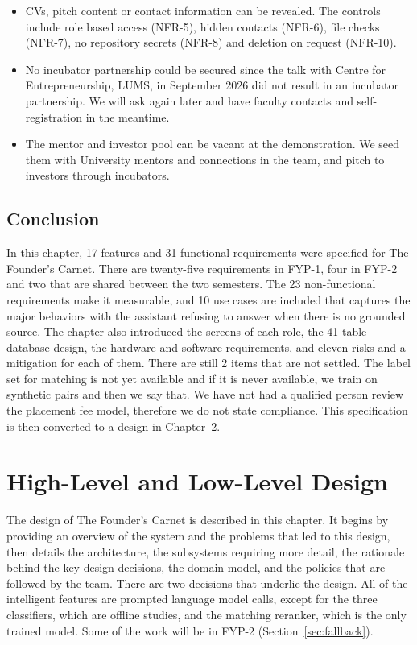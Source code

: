 \documentclass{FastFyp}
\begin{document}
\begin{itemize}
 \item CVs, pitch content or contact information can be revealed. The controls include role based access (NFR-5), hidden contacts (NFR-6), file checks (NFR-7), no repository secrets (NFR-8) and deletion on request (NFR-10).
 \item No incubator partnership could be secured since the talk with Centre for Entrepreneurship, LUMS, in September 2026 did not result in an incubator partnership. We will ask again later and have faculty contacts and self-registration in the meantime.
 \item The mentor and investor pool can be vacant at the demonstration. We seed them with University mentors and connections in the team, and pitch to investors through incubators.
\end{itemize}

\section{Conclusion}
In this chapter, 17 features and 31 functional requirements were specified for The Founder's Carnet. There are twenty-five requirements in FYP-1, four in FYP-2 and two that are shared between the two semesters. The 23 non-functional requirements make it measurable, and 10 use cases are included that captures the major behaviors with the assistant refusing to answer when there is no grounded source. The chapter also introduced the screens of each role, the 41-table database design, the hardware and software requirements, and eleven risks and a mitigation for each of them. There are still 2 items that are not settled. The label set for matching is not yet available and if it is never available, we train on synthetic pairs and then we say that. We have not had a qualified person review the placement fee model, therefore we do not state compliance. This specification is then converted to a design in Chapter~\ref{chap:system-design}.

\chapter{High-Level and Low-Level Design}\label{chap:system-design}
The design of The Founder's Carnet is described in this chapter. It begins by providing an overview of the system and the problems that led to this design, then details the architecture, the subsystems requiring more detail, the rationale behind the key design decisions, the domain model, and the policies that are followed by the team. There are two decisions that underlie the design. All of the intelligent features are prompted language model calls, except for the three classifiers, which are offline studies, and the matching reranker, which is the only trained model. Some of the work will be in FYP-2 (Section~\ref{sec:fallback}).
\end{document}
